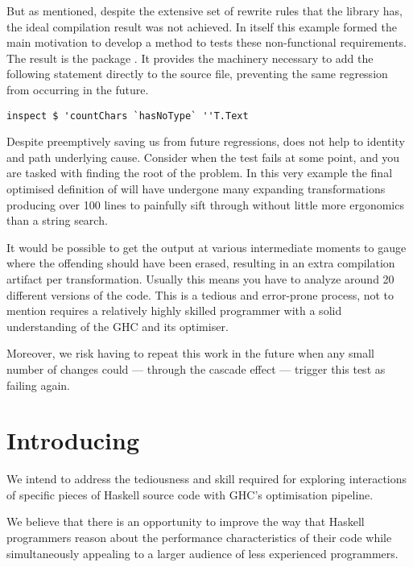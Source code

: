 But as mentioned, despite the extensive set of rewrite rules that the  library has, the
ideal compilation result was not achieved. In itself this example formed the main motivation to 
develop a method to tests these non-functional requirements.
The result is the  package \cite{inspection_testing}. 
It provides the machinery necessary to add the following statement
directly to the source file, preventing the same regression from occurring in the future.

\begin{verbatim}
inspect $ 'countChars `hasNoType` ''T.Text
\end{verbatim}

Despite preemptively saving us from future regressions,  does not help to
identity and path underlying cause. Consider when the test fails at
some point, and you are tasked with finding the root of the problem. In this very example the final 
optimised definition of  will have undergone many expanding transformations producing 
over 100 lines to painfully sift through without little more ergonomics than a string search. 

It would be possible to get the output at various intermediate moments to gauge where the 
offending  should have been erased, resulting in an extra compilation artifact per transformation.
Usually this means you have to analyze around 20 different versions of the code. 
This is a tedious and error-prone process, not to mention requires a relatively highly skilled programmer 
with a solid understanding of the GHC and its optimiser. 

Moreover, we risk having to repeat this work in the future when any small number of changes
could --- through the cascade effect --- trigger this test as failing again.

\section{Introducing }

We intend to address the tediousness and skill required for exploring interactions of specific 
pieces of Haskell source code with GHC's optimisation pipeline.

We believe that there is an opportunity to improve the way that Haskell programmers reason about
the performance characteristics of their code while simultaneously appealing to a larger audience
of less experienced programmers.

